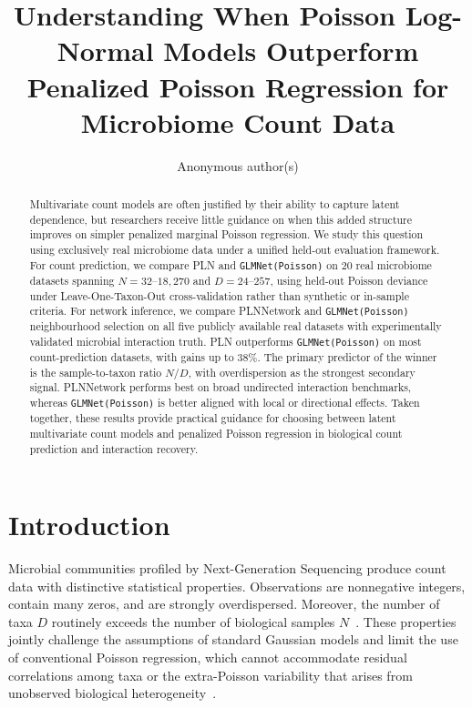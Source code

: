 \documentclass[Review,doublespace,sageh,times]{sagej}
\newcommand{\papertitle}{Understanding When Poisson Log-Normal Models Outperform Penalized Poisson Regression for Microbiome Count Data}
\begin{document}

\title{\papertitle}

\author{Anonymous author(s)}




\begin{abstract}
Multivariate count models are often justified by their ability to capture latent dependence, but researchers receive little guidance on when this added structure improves on simpler penalized marginal Poisson regression.
We study this question using exclusively real microbiome data under a unified held-out evaluation framework.
For count prediction, we compare PLN and \texttt{GLMNet(Poisson)} on 20 real microbiome datasets spanning $N = 32$--$18{,}270$ and $D = 24$--$257$, using held-out Poisson deviance under Leave-One-Taxon-Out cross-validation rather than synthetic or in-sample criteria.
For network inference, we compare PLNNetwork and \texttt{GLMNet(Poisson)} neighbourhood selection on all five publicly available real datasets with experimentally validated microbial interaction truth.
PLN outperforms \texttt{GLMNet(Poisson)} on most count-prediction datasets, with gains up to 38\%.
The primary predictor of the winner is the sample-to-taxon ratio $N/D$, with overdispersion as the strongest secondary signal.
PLNNetwork performs best on broad undirected interaction benchmarks, whereas \texttt{GLMNet(Poisson)} is better aligned with local or directional effects.
Taken together, these results provide practical guidance for choosing between latent multivariate count models and penalized Poisson regression in biological count prediction and interaction recovery.
\end{abstract}


\maketitle

\section{Introduction}
Microbial communities profiled by Next-Generation Sequencing produce count data with distinctive statistical properties.
Observations are nonnegative integers, contain many zeros, and are strongly overdispersed.   
Moreover, the number of taxa $D$ routinely exceeds the number of biological samples $N$~\citep{lagkouvardos2016imngs, Kodikara2022}.
These properties jointly challenge the assumptions of standard Gaussian models and limit the use of conventional Poisson regression, which cannot accommodate residual correlations among taxa or the extra-Poisson variability that arises from unobserved biological heterogeneity~\citep{mcmurdie2014waste, Chiquet2021}.
\end{document}
